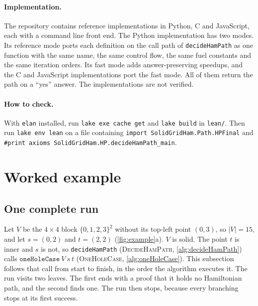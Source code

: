 \documentclass[11pt]{article}
\theoremstyle{plain}
\theoremstyle{definition}
\theoremstyle{remark}
\newcommand{\lean}[1]{\texttt{#1}}
\begin{document}
\paragraph{Implementation.}
The repository contains reference implementations in Python, C and JavaScript, each with a command
line front end.
The Python implementation has two modes.
Its reference mode ports each definition on the call path of \lean{decideHamPath} as one function with
the same name, the same control flow, the same fuel constants and the same iteration orders.
Its fast mode adds answer-preserving speedups, and the C and JavaScript implementations port the
fast mode.
All of them return the path on a ``yes'' answer.
The implementations are not verified.

\paragraph{How to check.}
With \lean{elan} installed, run \lean{lake exe cache get} and \lean{lake build} in \lean{lean/}.
Then run \lean{lake env lean} on a file containing
\lean{import SolidGridHam.Path.HPFinal} and \lean{\#print axioms SolidGridHam.HP.decideHamPath\_main}.

\section{Worked example}
\label{sec:example}


\subsection{One complete run}
\label{sec:run}

Let $V$ be the $4\times4$ block $\{0,1,2,3\}^2$ without its top-left point $(0,3)$, so $|V|=15$, and
let $s=(0,2)$ and $t=(2,2)$ (\cref{fig:example}a).
$V$ is solid.
The point $t$ is inner and $s$ is not, so \lean{decideHamPath} (\textsc{DecideHamPath}, \cref{alg:decideHamPath})
calls $\lean{oneHoleCase}\ V\ s\ t$ (\textsc{OneHoleCase}, \cref{alg:oneHoleCase}).
This subsection follows that call from start to finish, in the order the algorithm executes it.
The run visits two leaves.
The first ends with a proof that it holds no Hamiltonian path, and the second finds one.
The run then stops, because every branching stops at its first success.
\end{document}
